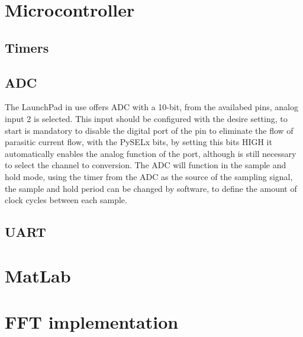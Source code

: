 \section{Microcontroller}
%
\subsection*{Timers}
\subsection*{ADC}
The LaunchPad in use offers ADC with a 10-bit, from the availabed pins, analog input 2 is selected. This input should be configured with the desire setting, to start is mandatory to disable the digital port of the pin to eliminate the flow of parasitic current flow, with the PySELx bits, by setting this bits HIGH it automatically enables the analog function of the port, although is still necessary to select the channel to conversion. The ADC will function in the sample and hold mode, using the timer from the ADC as the source of the sampling signal, the sample and hold period can be changed by software, to define the amount of clock cycles between each sample. 
\subsection*{UART}
\section{MatLab}
\section{FFT implementation}



